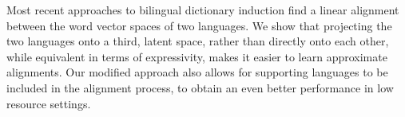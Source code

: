 Most recent approaches to bilingual dictionary induction find a linear alignment between the word vector spaces of two languages. We show that projecting the two languages onto a third, latent space, rather than directly onto each other, while  equivalent in terms of expressivity, makes it easier to learn approximate alignments. Our modified approach also allows for supporting languages to be included in the alignment process, to obtain an even better performance in low resource settings.
